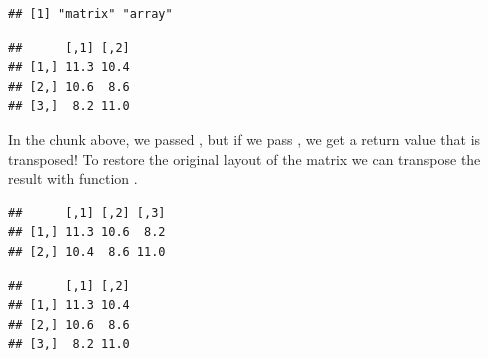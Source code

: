 \documentclass[krantz2]{krantz}\usepackage{knitr}
\begin{document}
\begin{knitrout}\footnotesize
{}\color{fgcolor}\begin{kframe}
\begin{alltt}
 \hlkwb{<-} \hlstd{(}
\end{alltt}
\end{kframe}
\end{knitrout}

\begin{knitrout}\footnotesize
{}\color{fgcolor}\begin{kframe}
\begin{alltt}
 \hlkwb{<-} \hlstd{(}   \hlstd{=} \hlstd{,}  
\end{alltt}
\begin{verbatim}
## [1] "matrix" "array"
\end{verbatim}
\begin{alltt}
\end{alltt}
\begin{verbatim}
##      [,1] [,2]
## [1,] 11.3 10.4
## [2,] 10.6  8.6
## [3,]  8.2 11.0
\end{verbatim}
\end{kframe}
\end{knitrout}

In the chunk above, we passed , but if we pass , we get a return value that is transposed! To restore the original layout of the matrix we can transpose the result with function .

\begin{knitrout}\footnotesize
{}\color{fgcolor}\begin{kframe}
\begin{alltt}
 \hlkwb{<-} \hlstd{(}   \hlstd{=} \hlstd{,}  
\end{alltt}
\begin{verbatim}
##      [,1] [,2] [,3]
## [1,] 11.3 10.6  8.2
## [2,] 10.4  8.6 11.0
\end{verbatim}
\begin{alltt}
\end{alltt}
\begin{verbatim}
##      [,1] [,2]
## [1,] 11.3 10.4
## [2,] 10.6  8.6
## [3,]  8.2 11.0
\end{verbatim}
\end{kframe}
\end{knitrout}
\end{document}
